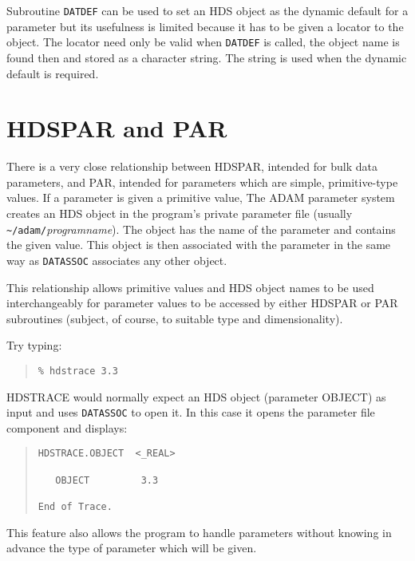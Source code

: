 \documentclass[twoside,11pt]{article}
\newcommand{\htmlref}[2]{#1}
\newcommand{\xref}[3]{#1}
\newcommand{\xlabel}[1]{}
\renewcommand{\_}{\texttt{\symbol{95}}}
\begin{document}
Subroutine
\htmlref{\texttt{DAT\_DEF}}{DAT_DEF}
can be used to set an HDS object as the dynamic default for a parameter but its
usefulness is limited because it has to be given a locator to the object.
The locator need only be valid when \texttt{DAT\_DEF} is called, the object
name is found then and stored as a character string.
The string is used when the dynamic default is required.

\section{\xlabel{hdspar_and_par}HDSPAR and PAR}
There is a very close relationship between
HDSPAR, intended for bulk data parameters, and
\xref{PAR}{sun114}{abstract},
intended for parameters which are simple,
\xref{primitive-type}{sun92}{HDS_objects}
values.
If a parameter is given a primitive value, The ADAM parameter system creates
an HDS object in the program's private parameter file (usually
\verb!~/adam/!\textit{program\_name}).
The object has the name of the parameter and contains the given value.
This object is then associated with the parameter in the same way as
\htmlref{\texttt{DAT\_ASSOC}}{DAT_ASSOC}
associates any other object.

This relationship allows primitive values and HDS object names to be used
interchangeably for parameter values to be accessed by either HDSPAR or PAR
subroutines (subject, of course, to suitable type and dimensionality).

Try typing:
\begin{quote} \begin{verbatim}
% hdstrace 3.3
\end{verbatim} \end{quote}

\xref{HDSTRACE}{sun102}{abstract}
would normally expect an HDS object (parameter OBJECT) as input and uses
\texttt{DAT\_ASSOC} to open it.
In this case it opens the parameter file component and displays:
\begin{quote} \begin{verbatim}
HDSTRACE.OBJECT  <_REAL>

   OBJECT         3.3

End of Trace.
\end{verbatim} \end{quote}

This feature also allows the program to handle parameters without knowing in
advance the type of parameter which will be given.
\end{document}
